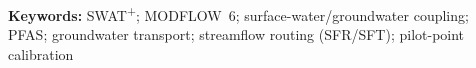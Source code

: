 \vspace{0.5em}
\noindent\textbf{Keywords:} SWAT\textsuperscript{+}; MODFLOW~6; surface-water/groundwater
coupling; PFAS; groundwater transport; streamflow routing (SFR/SFT);
pilot-point calibration
